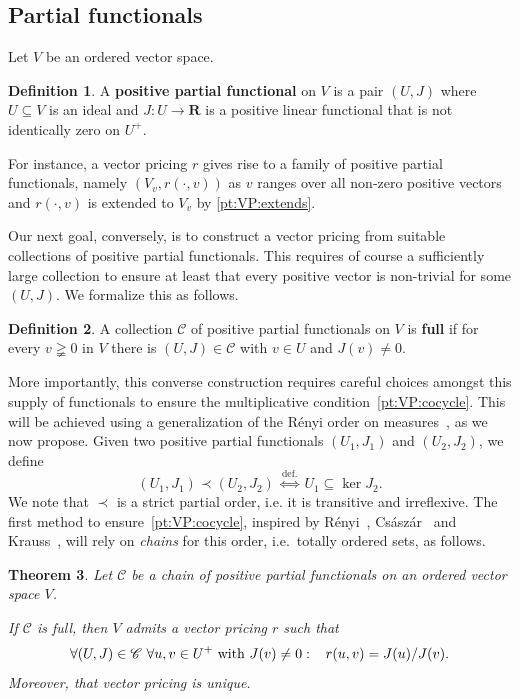\documentclass[11pt]{amsart}
\numberwithin{equation}{section}
\newtheorem{thm}{Theorem}[section]
\theoremstyle{definition}
\newtheorem{defi}[thm]{Definition}
\theoremstyle{definition}
\newcommand*{\sC}{\mathscr{C}}
\newcommand*{\RR}{\mathbf{R}}
\newcommand*{\se}{\subseteq}
\begin{document}
\subsection{Partial functionals}%
Let $V$ be an ordered vector space.

\begin{defi}
A \textbf{positive partial functional} on $V$ is a pair $(U, J)$ where $U\se V$ is an ideal and $J\colon U \to \RR$ is a positive linear functional that is not identically zero on $U^+$.
\end{defi}

For instance, a vector pricing $r$ gives rise to a family of positive partial functionals, namely $(V_v, r(\cdot, v))$ as $v$ ranges over all non-zero positive vectors and $r(\cdot, v)$ is extended to $V_v$ by \ref{pt:VP:extends}.

Our next goal, conversely, is to construct a vector pricing from suitable collections of positive partial functionals. This requires of course a sufficiently large collection to ensure at least that every positive vector is non-trivial for some $(U,J)$. We formalize this as follows.

\begin{defi}
A collection $\sC$ of positive partial functionals on $V$ is \textbf{full} if for every $v\gneqq 0$ in $V$ there is $(U, J)\in \sC$ with $v\in U$ and $J(v)\neq 0$.
\end{defi}

More importantly, this converse construction requires careful choices amongst this supply of functionals to ensure the multiplicative condition~\ref{pt:VP:cocycle}. This will be achieved using a generalization of the R{\'e}nyi order on measures~\cite{Renyi56}, as we now propose. Given two positive partial functionals $(U_1, J_1)$ and $(U_2, J_2)$, we define
\begin{equation*}
(U_1, J_1) \prec (U_2, J_2) \ \overset{\text{def.}}{\Longleftrightarrow}\ U_1 \se \ker J_2.
\end{equation*}
We note that $\prec$ is a strict partial order, i.e. it is transitive and irreflexive. The first method to ensure~\ref{pt:VP:cocycle}, inspired by R{\'e}nyi~\cite{Renyi56}, Cs{\'a}sz{\'a}r~\cite{Csaszar55} and Krauss~\cite{Krauss68}, will rely on \emph{chains} for this order, i.e.\ totally ordered sets, as follows.

\begin{thm}\label{thm:chain-VP}
Let $\sC$ be a chain of positive partial functionals on an ordered vector space $V$.

If $\sC$ is full, then $V$ admits a vector pricing $r$ such that
\begin{equation*}
\forall (U, J) \in \sC \ \forall u,v\in U^+\ \text{with } J(v) \neq 0 :\kern3mm r(u,v) = J(u) / J(v).
\end{equation*}
Moreover, that vector pricing is unique.
\end{thm}
\end{document}
